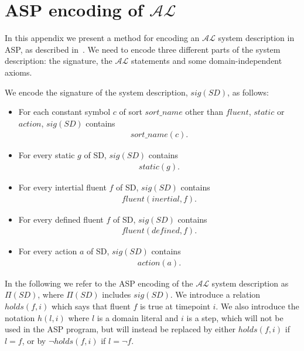 \documentclass[../interim.tex]{subfiles}
\begin{document}
\chapter{ASP encoding of $\mathcal{AL}$} \label{appendix-al}

In this appendix we present a method for encoding an $\mathcal{AL}$ system description in ASP, as described in~\cite{krr-asp-book}. We need to encode three different parts of the system description: the signature, the $\mathcal{AL}$ statements and some domain-independent axioms.

\noindent
We encode the signature of the system description, $sig(SD)$, as follows:
\begin{itemize}
  \item For each constant symbol $c$ of sort $sort\_name$ other than $fluent$, $static$ or $action$, $sig(SD)$ contains \begin{align} sort\_name(c). \end{align}

  \item For every static $g$ of SD, $sig(SD)$ contains \begin{align} static(g). \end{align}

  \item For every intertial fluent $f$ of SD, $sig(SD)$ contains \begin{align} fluent(inertial, f). \end{align}

  \item For every defined fluent $f$ of SD, $sig(SD)$ contains \begin{align} fluent(defined, f). \end{align}

  \item For every action $a$ of SD, $sig(SD)$ contains \begin{align} action(a). \end{align}
\end{itemize}

In the following we refer to the ASP encoding of the $\mathcal{AL}$ system description as $\Pi(SD)$, where $\Pi(SD)$ includes $sig(SD)$. We introduce a relation $holds(f, i)$ which says that fluent $f$ is true at timepoint $i$. We also introduce the notation $h(l, i)$ where $l$ is a domain literal and $i$ is a step, which will not be used in the ASP program, but will instead be replaced by either $holds(f, i)$ if $l = f$, or by $\neg holds(f, i)$ if $l = \neg f$.
\end{document}
